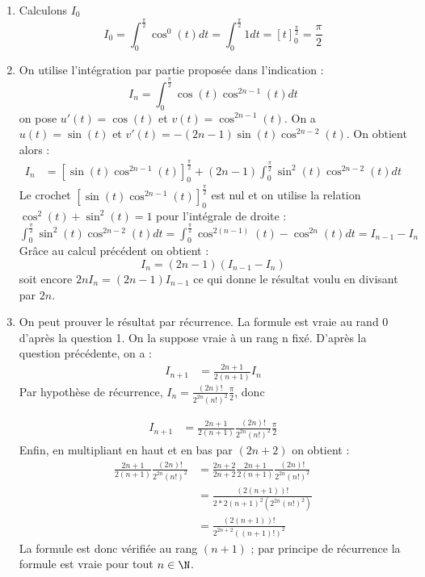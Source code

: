 \documentclass[a4paper, 11pt,reqno]{article}
\begin{document}
\begin{correction}
\begin{enumerate}
\item Calculons $I_0$ 
 $$I_0  = \int_0^{\frac{\pi}{2}} \cos^{0}(t) dt = \int_0^{\frac{\pi}{2}} 1dt= \left[t \right]_0^{\frac{\pi}{2}} =\frac{\pi}{2}$$

\item 

On utilise l'intégration par partie proposée dans l'indication : 
$$I_n  =  \int_0^{\frac{\pi}{2}}  \cos(t) \cos^{2n-1} (t) dt $$
on pose $u'(t)= \cos(t) $ et $v(t) =\cos^{2n-1}(t)$. On a $u(t)= \sin(t)$ et $v'(t) = -(2n-1) \sin(t) \cos^{2n-2}(t)$. On obtient alors : 
\begin{align*}
I_n &= \left[ \sin(t) \cos^{2n-1}(t)\right]_0^{\frac{\pi}{2}}  +(2n-1) \int_0^{\frac{\pi}{2}}  \sin^2(t) \cos^{2n-2} (t)dt
\end{align*}
Le crochet $\left[ \sin(t) \cos^{2n-1}(t)\right]_0^{\frac{\pi}{2}}$ est nul et on utilise la relation $\cos^2(t) + \sin^2(t) =1$ pour l'intégrale de droite : 
$\int_0^{\frac{\pi}{2}}  \sin^2(t) \cos^{2n-2} (t)dt =  \int_0^{\frac{\pi}{2}}  \cos^{2(n-1)} (t)- \cos^{2n}(t)dt = I_{n-1} -I_n$
Grâce au calcul précédent on obtient : 
$$I_n = (2n-1)(I_{n-1} -I_n)$$ 
soit encore $2nI_n = (2n-1) I_{n-1}$ ce qui donne le résultat voulu en divisant par $2n$. 

\item On peut prouver le résultat par récurrence.  La formule est vraie au rand 0 d'après la question 1. On la suppose vraie à un rang n fixé. D'après la question précédente, on a : 
\begin{align*}
I_{n+1} &= \frac{2n+1}{2(n+1)} I_{n}
\end{align*}
Par hypothèse de récurrence,  $I_n =  \frac{(2n)! }{2^{2n} (n!)^2} \frac{\pi}{2}$, donc 

\begin{align*}
I_{n+1} &= \frac{2n+1}{2(n+1)} \frac{(2n)! }{2^{2n} (n!)^2} \frac{\pi}{2}
\end{align*}
Enfin, en multipliant en haut et en bas par $(2n+2)$ on obtient : 
\begin{align*}
\frac{2n+1}{2(n+1)} \frac{(2n)! }{2^{2n} (n!)^2}  &=  \frac{2n+2}{2n+2}\frac{2n+1}{2(n+1)} \frac{(2n)! }{2^{2n} (n!)^2} \\
&= \frac{(2(n+1))!}{ 2*2 (n+1)^2 (2^{2n} (n!)^2)}\\
&= \frac{(2(n+1))!}{ 2^{2n+2} ((n+1)!)^2}
\end{align*}
La formule est donc vérifiée au rang $(n+1)$ ; par principe de récurrence la formule est vraie pour tout $n\in \N$. 
\end{enumerate}
\end{correction}
\end{document}
